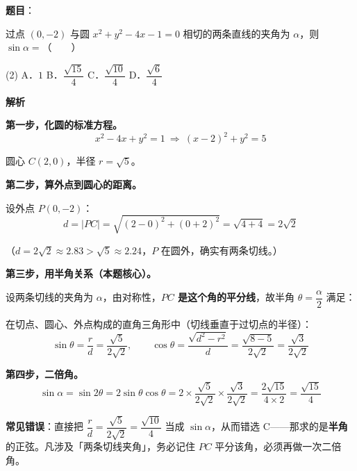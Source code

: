 \begin{answer}

\textbf{题目}：

过点 $(0,-2)$ 与圆 $x^{2}+y^{2}-4x-1=0$ 相切的两条直线的夹角为 $\alpha$，则 $\sin\alpha=$\mbox{（　　）}

\begin{gkopts}(2)
\task A．$1$
\task B．$\dfrac{\sqrt{15}}4$
\task C．$\dfrac{\sqrt{10}}4$
\task D．$\dfrac{\sqrt6}4$
\end{gkopts}

\textbf{解析}

\textbf{第一步，化圆的标准方程。}
\nopagebreak[4]
\[x^{2}-4x+y^{2}=1\ \Longrightarrow\ (x-2)^{2}+y^{2}=5\]

圆心 $C(2,0)$，半径 $r=\sqrt5$。

\textbf{第二步，算外点到圆心的距离。}

设外点 $P(0,-2)$：
\nopagebreak[4]
\[d=|PC|=\sqrt{(2-0)^{2}+(0+2)^{2}}=\sqrt{4+4}=2\sqrt2\]

（$d=2\sqrt2\approx2.83>\sqrt5\approx2.24$，$P$ 在圆外，确实有两条切线。）

\textbf{第三步，用半角关系（本题核心）。}

设两条切线的夹角为 $\alpha$，由对称性，\textbf{$PC$ 是这个角的平分线}，故半角 $\theta=\dfrac\alpha2$ 满足：

在切点、圆心、外点构成的直角三角形中（切线垂直于过切点的半径）：
\nopagebreak[4]
\[\sin\theta=\frac rd=\frac{\sqrt5}{2\sqrt2},\qquad \cos\theta=\frac{\sqrt{d^{2}-r^{2}}}d=\frac{\sqrt{8-5}}{2\sqrt2}=\frac{\sqrt3}{2\sqrt2}\]

\textbf{第四步，二倍角。}
\nopagebreak[4]
\[\sin\alpha=\sin2\theta=2\sin\theta\cos\theta=2\times\frac{\sqrt5}{2\sqrt2}\times\frac{\sqrt3}{2\sqrt2}=\frac{2\sqrt{15}}{4\times2}=\frac{\sqrt{15}}4\]

\begin{gktip}
\textbf{常见错误}：直接把 $\dfrac rd=\dfrac{\sqrt5}{2\sqrt2}=\dfrac{\sqrt{10}}4$ 当成 $\sin\alpha$，从而错选 C——那求的是\textbf{半角}的正弦。凡涉及「两条切线夹角」，务必记住 $PC$ 平分该角，必须再做一次二倍角。
\end{gktip}


\par\medskip

\end{answer}
